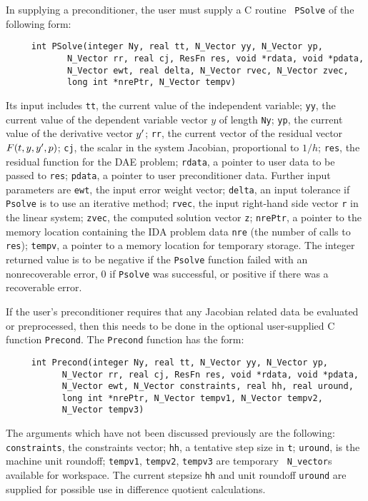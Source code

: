 In supplying a preconditioner, the user must supply a C routine {\tt
PSolve} of the following form:
\begin{verbatim}
     int PSolve(integer Ny, real tt, N_Vector yy, N_Vector yp,
            N_Vector rr, real cj, ResFn res, void *rdata, void *pdata,
            N_Vector ewt, real delta, N_Vector rvec, N_Vector zvec,
            long int *nrePtr, N_Vector tempv)
\end{verbatim}
Its input includes 
{\tt tt}, the current value of the independent variable; 
{\tt yy}, the current value of the dependent variable vector $y$ of
length {\tt Ny}; 
{\tt yp}, the current value of the derivative vector $y^{\prime}$;
{\tt rr}, the current vector of the residual vector
$F(t,y,y^{\prime},p)$; 
{\tt cj}, the scalar in the system Jacobian, proportional to $1/h$;
{\tt res}, the residual function for the DAE problem;
{\tt rdata}, a pointer to user data to be passed to {\tt res};
{\tt pdata}, a pointer to user preconditioner data.
Further input parameters are 
{\tt ewt}, the input error weight vector; 
{\tt delta}, an input tolerance if {\tt Psolve} is to use an iterative
method; 
{\tt rvec}, the input right-hand side vector {\tt r} in the linear system;
{\tt zvec}, the computed solution vector {\tt z};
{\tt nrePtr}, a pointer to the memory location containing the IDA
problem data {\tt nre} (the number of calls to {\tt res});
{\tt tempv}, a pointer to a memory location for temporary storage.
The integer returned value is to be negative if the {\tt Psolve}
function failed with an nonrecoverable error, 0 if {\tt Psolve} was
successful, or positive if there was a recoverable error.

If the user's preconditioner requires that any Jacobian related data
be evaluated or preprocessed, then this needs to be done in the
optional user-supplied C function {\tt Precond}.
The {\tt Precond} function has the form:
\begin{verbatim}
     int Precond(integer Ny, real tt, N_Vector yy, N_Vector yp,
           N_Vector rr, real cj, ResFn res, void *rdata, void *pdata,
           N_Vector ewt, N_Vector constraints, real hh, real uround,
           long int *nrePtr, N_Vector tempv1, N_Vector tempv2,
           N_Vector tempv3)
\end{verbatim}
The arguments which have not been discussed previously are the
following:
{\tt constraints}, the constraints vector;
{\tt hh}, a tentative step size in {\tt t};
{\tt uround}, is the machine unit roundoff;
{\tt tempv1}, {\tt tempv2}, {\tt tempv3} are temporary {\tt
N\_vector}s available for workspace.
The current stepsize {\tt hh} and unit roundoff {\tt uround} are
supplied for possible use in difference quotient calculations.

